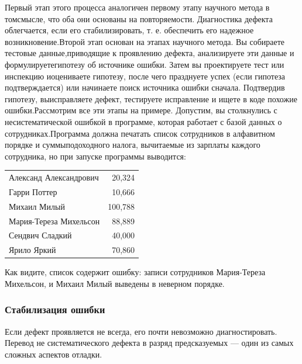 \documentclass[a4paper]{article}
\begin{document}
Первый  этап  этого  процесса  аналогичен  первому  этапу  научного  метода  в  томсмысле,  что  оба  они  основаны  на  повторяемости.  Диагностика  дефекта  облегчается,  если  его  стабилизировать,  т. е.  обеспечить  его  надежное  возникновение.Второй  этап  основан  на  этапах  научного  метода.  Вы  собираете  тестовые  данные,приводящие  к  проявлению  дефекта,  анализируете  эти  данные  и  формулируетегипотезу  об  источнике  ошибки.  Затем  вы  проектируете  тест  или  инспекцию  иоцениваете  гипотезу,  после  чего  празднуете  успех  (если  гипотеза  подтверждается)  или  начинаете  поиск  источника  ошибки  сначала.  Подтвердив  гипотезу,  выисправляете  дефект,  тестируете  исправление  и  ищете  в  коде  похожие  ошибки.Рассмотрим  все  эти  этапы  на  примере.  Допустим,  вы  столкнулись  с  несистематической  ошибкой  в  программе,  которая  работает  с  базой  данных  о  сотрудниках.Программа  должна  печатать  список  сотрудников  в  алфавитном  порядке  и  суммыподоходного  налога,  вычитаемые  из  зарплаты  каждого  сотрудника,  но  при  запуске  программы  выводится:

\begin{tabular}{lr}
Александ Александрович & 20,324 \\
Гарри Поттер               &   10,666 \\
Михаил Милый           &  100,788 \\
Мария-Тереза Михельсон           &   88,889 \\
Сендвич Сладкий      &   40,000 \\
Ярило Яркий           &   70,860 \\
\end{tabular}

Как  видите,  список  содержит  ошибку:  записи  сотрудников  Мария-Тереза Михельсон, и Михаил Милый  выведены  в  неверном  порядке.

\subsubsection{Стабилизация ошибки}

Если  дефект  проявляется  не  всегда,  его  почти  невозможно  диагностировать.  Перевод не систематического дефекта в разряд предсказуемых — один из самых сложных  аспектов  отладки.
\end{document}
